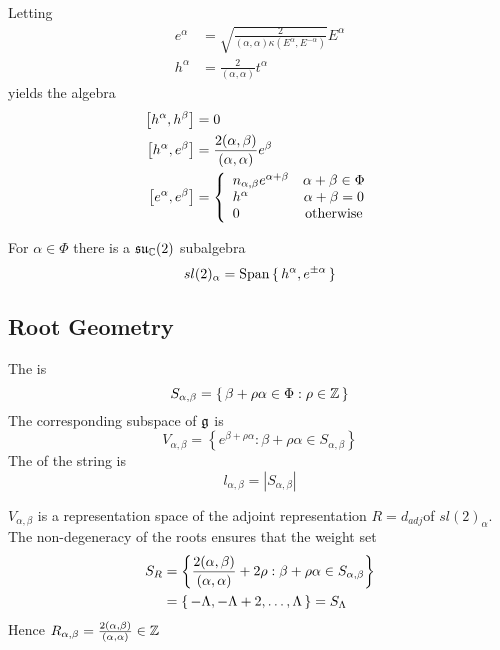 \documentclass{article}
\begin{document}
\begin{theorem}
	Letting 
	\begin{align*}
	e^\alpha &= \sqrt{\frac{2}{(\alpha,\alpha)\kappa\left(E^\alpha,E^{-\alpha}\right)}}E^\alpha \\
	h^\alpha &= \frac{2}{(\alpha,\alpha)}t^\alpha
	\end{align*}
	yields the algebra
	\begin{align*}
	\comm[h^\alpha]{h^\beta} &= 0 \\
	\comm[h^\alpha]{e^\beta} &= \frac{2(\alpha,\beta)}{(\alpha,\alpha)}e^\beta \\
	\comm[e^\alpha]{e^\beta} &= \left\{ \begin{array}{lc} n_{\alpha,\beta}e^{\alpha+\beta} & \alpha+\beta\in\Phi \\
	h^\alpha & \alpha+\beta=0 \\
	0 & \text{otherwise}
	\end{array} \right.\\
	\end{align*}
\end{theorem}

\begin{definition}[$sl(2)_\alpha$]
	For $\alpha\in\Phi$ there is a $\mf{su}_\mbb{C}(2)$ subalgebra 
	\[
	sl(2)_\alpha=\spn\set{  h^\alpha, e^{\pm\alpha} }
	\]
\end{definition}

\subsection{Root Geometry}

\begin{definition}
	The  is 
	\[
	S_{\alpha, \beta}=\set{  \beta+\rho\alpha\in\Phi : \rho\in\mbb{Z}  }
	\]
	The corresponding subspace of $\mf{g}$ is 
	\[
	V_{\alpha, \beta}=\left\{ e^{\beta+\rho\alpha} : \beta+\rho\alpha\in S_{\alpha, \beta} \right\}
	\]
	The  of the string is 
	\[
	l_{\alpha,\beta}=|S_{\alpha,\beta}|
	\]
\end{definition}
\begin{fact}
	$V_{\alpha, \beta}$ is a representation space of the adjoint representation $R=d_{adj}$of $sl(2)_\alpha$. The non-degeneracy of the roots ensures that the weight set 
	\begin{align*}
	S_R &= \left\{ \frac{2(\alpha,\beta)}{(\alpha,\alpha)}+2\rho : \beta+\rho\alpha\in S_{\alpha, \beta} \right\} \\
	&= \set{  -\Lambda,-\Lambda+2,\dots,\Lambda }=S_\Lambda \\
	\end{align*}
	Hence $R_{\alpha,\beta}=\frac{2(\alpha,\beta)}{(\alpha,\alpha)} \in\mbb{Z}$
\end{fact}
\end{document}
